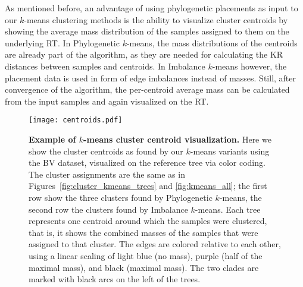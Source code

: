 As mentioned before, an advantage of using phylogenetic placements as input to our $k$-means clustering methods
is the ability to visualize cluster centroids by showing the average mass distribution
of the samples assigned to them on the underlying \acf{RT}.
In Phylogenetic $k$-means, the mass distributions of the centroids are already part of the algorithm,
as they are needed for calculating the KR distances between samples and centroids.
In Imbalance $k$-means however, the placement data is used in form of edge imbalances instead of masses.
Still, after convergence of the algorithm, the per-centroid average mass can be calculated from the input samples
and again visualized on the \ac{RT}.

\begin{figure}[!tb]
    \centering
    \texttt{[image: centroids.pdf]}
    \begin{subfigure}{0pt}
        \label{fig:centroids:sub:red}
    \end{subfigure}
    \begin{subfigure}{0pt}
        \label{fig:centroids:sub:green}
    \end{subfigure}
    \begin{subfigure}{0pt}
        \label{fig:centroids:sub:blue}
    \end{subfigure}
    \begin{subfigure}{0pt}
        \label{fig:centroids:sub:purple}
    \end{subfigure}
    \begin{subfigure}{0pt}
        \label{fig:centroids:sub:orange}
    \end{subfigure}
    \begin{subfigure}{0pt}
        \label{fig:centroids:sub:gray}
    \end{subfigure}
    \caption[Example of $k$-means cluster centroid visualization]{
        \textbf{Example of $k$-means cluster centroid visualization.}
        Here we show the cluster centroids as found by our $k$-means variants using the \ac{BV} dataset,
        visualized on the reference tree via color coding.
        The cluster assignments are the same as in Figures~\ref{fig:cluster_kmeans_trees} and \ref{fig:kmeans_all};
        the first row show the three clusters found by Phylogenetic $k$-means,
        the second row the clusters found by Imbalance $k$-means.
        Each tree represents one centroid around which the samples were clustered,
        that is, it shows the combined masses of the samples that were assigned to that cluster.
        The edges are colored relative to each other, using a linear scaling of
        light blue (no mass), purple (half of the maximal mass), and black (maximal mass).
        The two  clades are marked with black arcs on the left of the trees.
    }
    \label{fig:centroids}
\end{figure}

